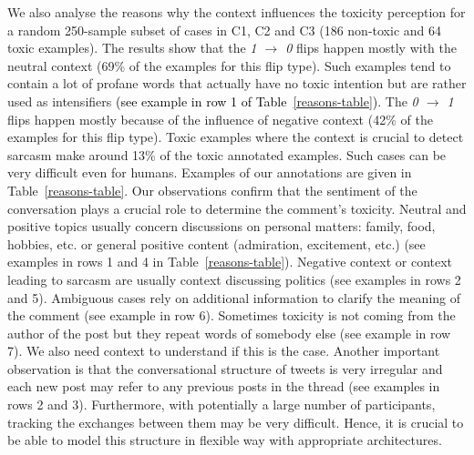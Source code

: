 \documentclass[acmsmall]{acmart}
\newcommand{\red}[1]{\textcolor{black}{#1}}
\begin{document}
We also analyse the reasons why the context influences the toxicity perception for a random 250-sample subset of cases in C1, C2 and C3 (186 non-toxic and 64 toxic examples). The results show that the \textit{1 $\rightarrow$ 0} flips happen mostly with the neutral context (69\% of the examples for this flip type). Such examples tend to contain a lot of profane words that actually have no toxic intention but are rather used as intensifiers \red{(see example in row 1 of Table~\ref{reasons-table})}. The \textit{0 $\rightarrow$ 1} flips happen mostly because of the influence of negative context (42\% of the examples for this flip type). Toxic examples where the context is crucial to detect sarcasm make around 13\% of the toxic annotated examples. Such cases can be very difficult even for humans. Examples of our annotations are given in Table~\ref{reasons-table}. Our observations confirm that the sentiment of the conversation plays a crucial role to determine the comment's toxicity. Neutral and positive topics usually concern discussions on personal matters: family, food, hobbies, etc. or general positive content (admiration, excitement, etc.) (see examples in rows 1 and 4 in Table~\ref{reasons-table}). Negative context or context leading to sarcasm are usually context discussing politics (see examples in rows 2 and 5). Ambiguous cases rely on additional information to clarify the meaning of the comment (see example in row 6). Sometimes toxicity is not coming from the author of the post but they repeat words of somebody else (see example in row 7). We also need context to understand if this is the case. Another important observation is that the conversational structure of tweets is very irregular and each new post may refer to any previous posts in the thread (see examples in rows 2 and 3). Furthermore, with potentially a large number of participants, tracking the exchanges between them may be very difficult. Hence, it is crucial to be able to model this structure in flexible way with appropriate architectures.
\end{document}

